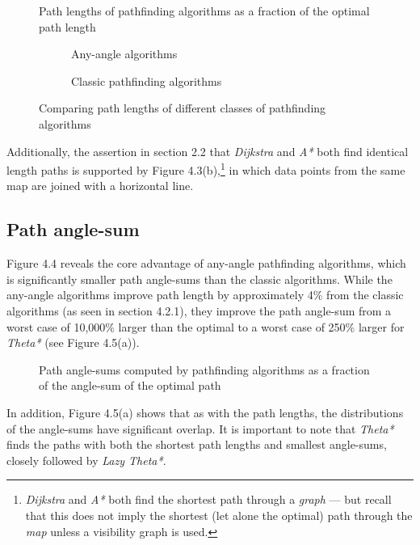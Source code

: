 \documentclass[12pt,notitlepage]{report}
\begin{document}
\begin{figure}
\centering

\caption[Path lengths computed by pathfinding algorithms]{Path lengths of pathfinding algorithms as a fraction of the optimal path length}
\end{figure}

\begin{figure}
\centering
  \begin{subfigure}{0.49\textwidth}
  \centering
  
  \caption{Any-angle algorithms}
  \end{subfigure}
  \begin{subfigure}{0.49\textwidth}
  \centering
  
  \caption{Classic pathfinding algorithms}
  \end{subfigure}
\caption{Comparing path lengths of different classes of pathfinding algorithms}
\end{figure}

\noindent
Additionally, the assertion in section 2.2 that {\em Dijkstra} and {\em A*} both find identical length paths is supported by Figure 4.3(b),\footnote{{\em Dijkstra} and {\em A*} both find the shortest path through a {\em graph} --- but recall that this does not imply the shortest (let alone the optimal) path through the {\em map} unless a visibility graph is used.} in which data points from the same map are joined with a horizontal line.

\subsection{Path angle-sum}

Figure 4.4 reveals the core advantage of any-angle pathfinding algorithms, which is significantly smaller path angle-sums than the classic algorithms. While the any-angle algorithms improve path length by approximately 4\% from the classic algorithms (as seen in section 4.2.1), they improve the path angle-sum from a worst case of 10,000\% larger than the optimal to a worst case of 250\% larger for {\em Theta*} (see Figure 4.5(a)).\\

\begin{figure}
\centering

\caption[Path angle-sums computed by pathfinding algorithms]{Path angle-sums computed by pathfinding algorithms as a fraction of the angle-sum of the optimal path}
\end{figure}

\noindent
In addition, Figure 4.5(a) shows that as with the path lengths, the distributions of the angle-sums have significant overlap. It is important to note that {\em Theta*} finds the paths with both the shortest path lengths and smallest angle-sums, closely followed by {\em Lazy Theta*}.\\
\end{document}
